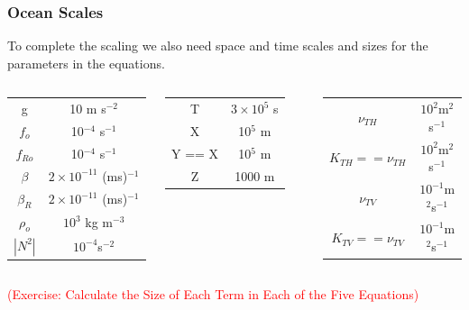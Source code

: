 \documentclass[xcolor=dvipsnames]{beamer}
\begin{document}
\begin{frame}
\frametitle{Ocean Scales}

To complete the scaling we also need space and time scales and sizes for the parameters in the equations.\\ \vspace{0.2in}

\begin{columns}[c]
\column{2in}
\begin{tabular}{cc}
\hline
g & 10 m s$^{-2}$\\
$f_o$ & 10$^{-4}$ s$^{-1}$\\
$f_{Ro}$ & 10$^{-4}$ s$^{-1}$\\
$\beta$ & $2 \times 10^{-11}$ (ms)$^{-1}$\\
$\beta_R$ & $2 \times 10^{-11}$ (ms)$^{-1}$\\
$\rho_o$ & $10^3$ kg m$^{-3}$\\
$|N^2|$ & $10^{-4}$s$^{-2}$\\
\hline
\end{tabular}
\column{2in}
\begin{tabular}{cc}
\hline
T & $3 \times 10^5$ s\\
X & 10$^5$ m\\
Y == X  & 10$^5$ m\\
Z & 1000 m\\
\hline
\end{tabular}
\begin{tabular}{cc}
\hline
$\nu_{TH}$ &$10^{2}$m$^{2}$s$^{-1}$\\
$K_{TH} == \nu_{TH} $&$10^{2}$m$^{2}$s$^{-1}$\\
$\nu_{TV} $&$10^{-1}$m$^{2}$s$^{-1}$\\
$K_{TV} == \nu_{TV}  $&$10^{-1}$m$^{2}$s$^{-1}$\\
\hline
\end{tabular}
\end{columns}\vspace{0.2in}

\textcolor{red}{(Exercise: Calculate the Size of Each Term in Each of the Five Equations)}

\end{frame}
\end{document}
